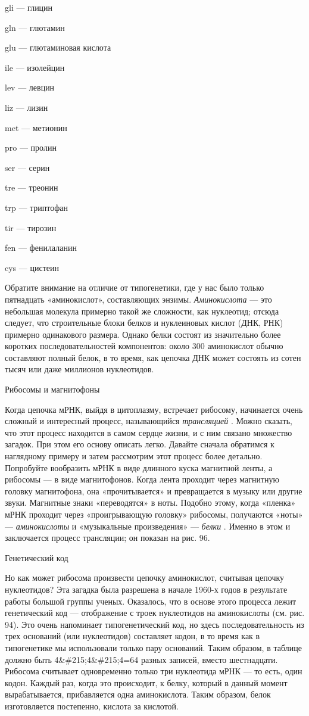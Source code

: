 gli --- глицин

gln --- глютамин

glu --- глютаминовая кислота

ile --- изолейцин

lev --- левцин

liz --- лизин

met --- метионин

pro --- пролин

ser --- серин

tre --- треонин

trp --- триптофан

tir --- тирозин

fen --- фенилаланин

cys --- цистеин

Обратите внимание на отличие от типогенетики, где у нас было только пятнадцать «аминокислот», составляющих энзимы. \emph{Аминокислота} --- это небольшая молекула примерно такой же сложности, как нуклеотид; отсюда следует, что строительные блоки белков и нуклеиновых кислот (ДНК, РНК) примерно одинакового размера. Однако белки состоят из значительно более коротких последовательностей компонентов: около 300 аминокислот обычно составляют полный белок, в то время, как цепочка ДНК может состоять из сотен тысяч или даже миллионов нуклеотидов.

Рибосомы и магнитофоны

Когда цепочка мРНК, выйдя в цитоплазму, встречает рибосому, начинается очень сложный и интересный процесс, называющийся \emph{трансляцией} . Можно сказать, что этот процесс находится в самом сердце жизни, и с ним связано множество загадок. При этом его основу описать легко. Давайте сначала обратимся к наглядному примеру и затем рассмотрим этот процесс более детально. Попробуйте вообразить мРНК в виде длинного куска магнитной ленты, а рибосомы --- в виде магнитофонов. Когда лента проходит через магнитную головку магнитофона, она «прочитывается» и превращается в музыку или другие звуки. Магнитные знаки «переводятся» в ноты. Подобно этому, когда «пленка» мРНК проходит через «проигрывающую головку» рибосомы, получаются «ноты» --- \emph{аминокислоты} и «музыкальные произведения» --- \emph{белки} . Именно в этом и заключается процесс трансляции; он показан на рис. 96.

Генетический код

Но как может рибосома произвести цепочку аминокислот, считывая цепочку нуклеотидов? Эта загадка была разрешена в начале 1960-х годов в результате работы большой группы ученых. Оказалось, что в основе этого процесса лежит генетический код --- отображение с троек нуклеотидов на аминокислоты (см. рис. 94). Это очень напоминает типогенетический код, но здесь последовательность из трех оснований (или нуклеотидов) составляет кодон, в то время как в типогенетике мы использовали только пару оснований. Таким образом, в таблице должно быть 4\&\#215;4\&\#215;4=64 разных записей, вместо шестнадцати. Рибосома считывает одновременно только три нуклеотида мРНК --- то есть, один кодон. Каждый раз, когда это происходит, к белку, который в данный момент вырабатывается, прибавляется одна аминокислота. Таким образом, белок изготовляется постепенно, кислота за кислотой.

